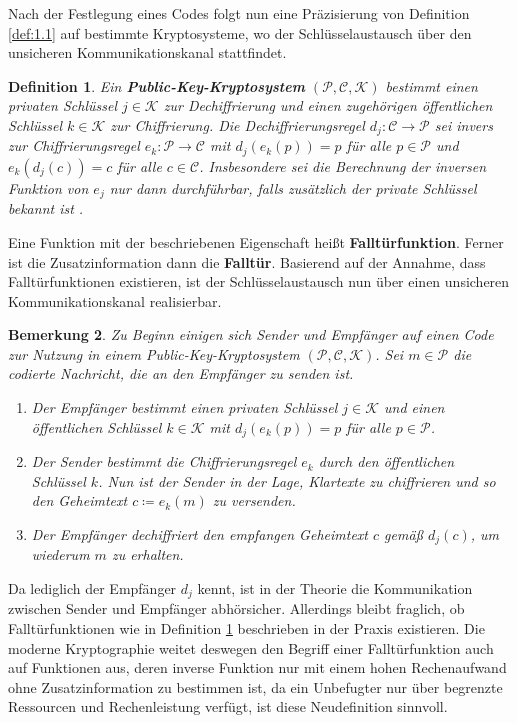 \documentclass{paper}
\theoremstyle{classic}
\newtheorem{definition}{Definition}[section]
\newtheorem{remark}[definition]{Bemerkung}
\begin{document}
Nach der Festlegung eines Codes folgt nun eine Präzisierung von Definition \ref{def:1.1} auf bestimmte Kryptosysteme, wo der Schlüsselaustausch über den unsicheren Kommunikationskanal stattfindet.
\begin{definition}
\label{def:1.4}
Ein \textbf{Public-Key-Kryptosystem} \((\mathcal{P},\mathcal{C},\mathcal{K})\) bestimmt einen privaten Schlüssel \(j \in \mathcal{K}\) zur Dechiffrierung und einen zugehörigen öffentlichen Schlüssel \(k \in \mathcal{K}\) zur Chiffrierung. Die Dechiffrierungsregel \(d_j : \mathcal{C} \rightarrow \mathcal{P}\) sei invers zur Chiffrierungsregel \(e_k : \mathcal{P} \rightarrow \mathcal{C}\) mit \(d_j(e_k(p)) = p\) für alle \(p \in \mathcal{P}\) und \(e_k(d_j(c)) = c\) für alle \(c \in \mathcal{C}\). Insbesondere sei die Berechnung der inversen Funktion von \(e_j\) nur dann durchführbar, falls zusätzlich der private Schlüssel bekannt ist \cite{pkx:1976}.
\end{definition}
Eine Funktion mit der beschriebenen Eigenschaft heißt \textbf{Falltürfunktion}. Ferner ist die Zusatzinformation dann die \textbf{Falltür}. Basierend auf der Annahme, dass Falltürfunktionen existieren, ist der Schlüsselaustausch nun über einen unsicheren Kommunikationskanal realisierbar.
\begin{remark}
\label{rem:1.5}
Zu Beginn einigen sich Sender und Empfänger auf einen Code zur Nutzung in einem Public-Key-Kryptosystem \((\mathcal{P},\mathcal{C},\mathcal{K})\). Sei \(m \in \mathcal{P}\) die codierte Nachricht, die an den Empfänger zu senden ist.
\begin{enumerate}
\item Der Empfänger bestimmt einen privaten Schlüssel \(j \in \mathcal{K}\) und einen öffentlichen Schlüssel \(k \in \mathcal{K}\) mit \(d_j(e_k(p)) = p\) für alle \(p \in \mathcal{P}\).
\item Der Sender bestimmt die Chiffrierungsregel \(e_k\) durch den öffentlichen Schlüssel \(k\). Nun ist der Sender in der Lage, Klartexte zu chiffrieren und so den Geheimtext \(c \coloneqq e_k(m)\) zu versenden.
\item Der Empfänger dechiffriert den empfangen Geheimtext \(c\) gemäß \(d_j(c)\), um wiederum \(m\) zu erhalten.
\end{enumerate}
\end{remark}
Da lediglich der Empfänger \(d_j\) kennt, ist in der Theorie die Kommunikation zwischen Sender und Empfänger abhörsicher. Allerdings bleibt fraglich, ob Falltürfunktionen wie in Definition \ref{def:1.4} beschrieben in der Praxis existieren. Die moderne Kryptographie weitet deswegen den Begriff einer Falltürfunktion auch auf Funktionen aus, deren inverse Funktion nur mit einem hohen Rechenaufwand ohne Zusatzinformation zu bestimmen ist, da ein Unbefugter nur über begrenzte Ressourcen und Rechenleistung verfügt, ist diese Neudefinition sinnvoll.
\end{document}
